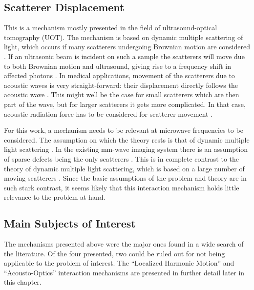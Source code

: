 \documentclass[11pt,twoside]{eitExjobb}
\begin{document}
	\subsection{Scatterer Displacement}
	This is a mechanism mostly presented in the field of ultrasound-optical tomography (UOT). The mechanism is based on dynamic multiple scattering of light, which occurs if many scatterers undergoing Brownian motion are considered \cite{Leutz1995}. If an ultrasonic beam is incident on such a sample the scatterers will move due to both Brownian motion and ultrasound, giving rise to a frequency shift in affected photons \cite{Leutz1995}\cite{Elson2011}. In medical applications, movement of the scatterers due to acoustic waves is very straight-forward: their displacement directly follows the acoustic wave \cite{Leutz1995}. This might well be the case for small scatterers which are then part of the wave, but for larger scatterers it gets more complicated. In that case, acoustic radiation force has to be considered for scatterer movement \cite{Torr1984}. 
	
	For this work, a mechanism needs to be relevant at microwave frequencies to be considered. The assumption on which the theory rests is that of dynamic multiple light scattering \cite{Leutz1995}. In the existing mm-wave imaging system there is an assumption of sparse defects being the only scatterers \cite{Helander2017}. This is in complete contrast to the theory of dynamic multiple light scattering, which is based on a large number of moving scatterers \cite{Leutz1995}. Since the basic assumptions of the problem and theory are in such stark contrast, it seems likely that this interaction mechanism holds little relevance to the problem at hand.
	
	\subsection{Main Subjects of Interest}
	The mechanisms presented above were the major ones found in a wide search of the literature. Of the four presented, two could be ruled out for not being applicable to the problem of interest. The ``Localized Harmonic Motion'' and ``Acousto-Optics'' interaction mechanisms are presented in further detail later in this chapter.
	
\end{document}

